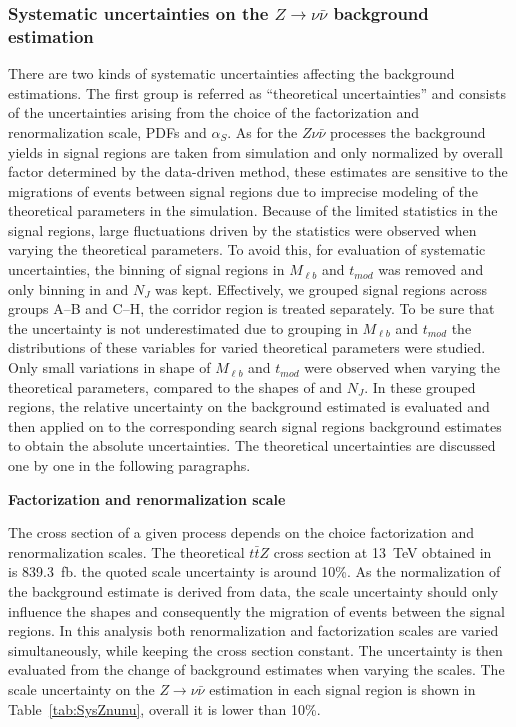 \subsubsection{Systematic uncertainties on the $Z \to \nu \bar{\nu}$ background estimation}

There are two kinds of systematic uncertainties affecting the background estimations. The first group is referred as ``theoretical uncertainties'' and consists of the uncertainties arising from the choice of the factorization and renormalization scale, PDFs and $\alpha_{S}$. As for the $Z \nu \bar{\nu}$ processes the background yields in signal regions are taken from simulation and only normalized by overall factor determined by the data-driven method, these estimates are sensitive to the migrations of events between signal regions due to imprecise modeling of the theoretical parameters in the simulation. Because of the limited statistics in the signal regions, large fluctuations driven by the statistics were observed when varying the theoretical parameters. To avoid this, for evaluation of systematic uncertainties, the binning of signal regions in $M_{\ell b}$ and $t_{mod}$ was removed and only binning in \MET and $N_{J}$ was kept. Effectively, we grouped signal regions across groups A--B and C--H, the corridor region is treated separately. To be sure that the uncertainty is not underestimated due to grouping in $M_{\ell b}$ and $t_{mod}$ the distributions of these variables for varied theoretical parameters were studied. Only small variations in shape of $M_{\ell b}$ and $t_{mod}$ were observed when varying the theoretical parameters, compared to the shapes of \MET and $N_{J}$. In these grouped regions, the relative uncertainty on the background estimated is evaluated and then applied on to the corresponding search signal regions background estimates to obtain the absolute uncertainties.  The theoretical uncertainties are discussed one by one in the following paragraphs.


\textbf{Factorization and renormalization scale}

The cross section of a given process depends on the choice factorization and renormalization scales. The theoretical $t\bar{t}Z$ cross section at 13~TeV obtained in~\cite{deFlorian:2016spz} is 839.3~fb. the quoted scale uncertainty is around 10\%. As the normalization of the background estimate is derived from data, the scale uncertainty should only influence the shapes and consequently the migration of events between the signal regions. In this analysis both renormalization and factorization scales are varied simultaneously, while keeping the cross section constant. The uncertainty is then evaluated from the change of background estimates when varying the scales. The scale uncertainty on the $Z \to \nu \bar{\nu}$ estimation in each signal region is shown in Table~\ref{tab:SysZnunu}, overall it is lower than 10\%.

